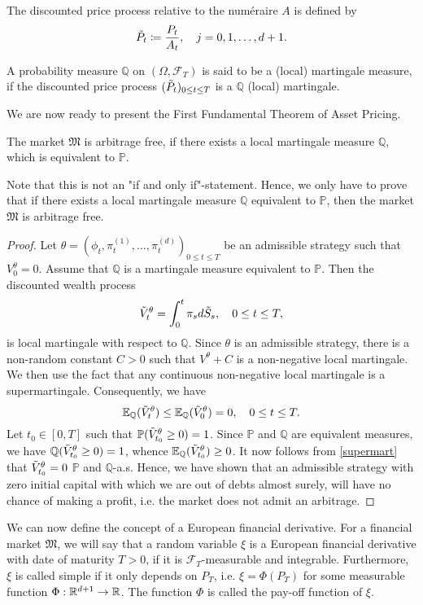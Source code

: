 The discounted price process relative to the numéraire $A$ is defined by
\begin{equation}
    \Tilde{P}_{t}\coloneqq\frac{P_t}{A_t}, \quad j=0,1,\dots,d+1.
\end{equation}
\begin{defn}
    A probability measure $\mathbb{Q}$ on $(\Omega,\mathcal{F}_{T})$ is said to be a (local) martingale measure, if the discounted price process $(\Tilde{P}_{t})_{0\leq t\leq T}$ is a $\mathbb{Q}$ (local) martingale.
\end{defn}
We are now ready to present the First Fundamental Theorem of Asset Pricing.
\begin{thm}
The market $\mathfrak{M}$ is arbitrage free, if there exists a local martingale measure $\mathbb{Q}$, which is equivalent to $\mathbb{P}$.
\end{thm}
Note that this is not an "if and only if"-statement. Hence, we only have to prove that if there exists a local martingale measure $\mathbb{Q}$ equivalent to $\mathbb{P}$, then the market $\mathfrak{M}$ is arbitrage free.
\begin{proof} Let $\theta=(\phi_{t},\pi_{t}^{(1)},\dots,\pi_{t}^{(d)})_{0\leq t\leq T}$ be an admissible strategy such that $V_{0}^{\theta}=0$. Assume that $\mathbb{Q}$ is a martingale measure equivalent to $\mathbb{P}$. Then the discounted wealth process
\begin{equation}
    \Tilde{V}_{t}^{\theta}=\int_{0}^{t}\pi_{s}d\Tilde{S}_{s}, \quad 0\leq t\leq T,
\end{equation}
is local martingale with respect to $\mathbb{Q}$. Since $\theta$ is an admissible strategy, there is a non-random constant $C>0$ such that $V^{\theta}+C$ is a non-negative local martingale. We then use the fact that any continuous non-negative local martingale is a supermartingale. Consequently, we have
\begin{equation}\label{supermart}
    \mathbb{E}_{\mathbb{Q}}(\Tilde{V}_{t}^{\theta})\leq \mathbb{E}_{\mathbb{Q}}(\Tilde{V}_{0}^{\theta})=0, \quad 0\leq t\leq T.
\end{equation}
Let $t_{0}\in [0,T]$ such that $\mathbb{P}(\Tilde{V}_{t_0}^{\theta}\geq 0)=1$. Since $\mathbb{P}$ and $\mathbb{Q}$ are equivalent measures, we have $\mathbb{Q}(\Tilde{V}_{t_0}^{\theta}\geq 0)=1$, whence $\mathbb{E}_{\mathbb{Q}}(\Tilde{V}_{t_{0}}^{\theta})\geq 0$. It now follows from \eqref{supermart} that $\Tilde{V}_{t_{0}}^{\theta}=0$ $\mathbb{P}$ and $\mathbb{Q}$-a.s. Hence, we have shown that an admissible strategy with zero initial capital with which we are out of debts almost surely, will have no chance of making a profit, i.e. the market does not admit an arbitrage.
\end{proof}
We can now define the concept of a European financial derivative. For a financial market $\mathfrak{M}$, we will say that a random variable $\xi$ is a European financial derivative with date of maturity $T>0$, if it is $\mathcal{F}_{T}$-measurable and integrable. Furthermore, $\xi$ is called simple if it only depends on $P_T$, i.e. $\xi=\Phi(P_T)$ for some measurable function $\Phi:\mathbb{R}^{d+1}\to \mathbb{R}$. The function $\Phi$ is called the pay-off function of $\xi$.

